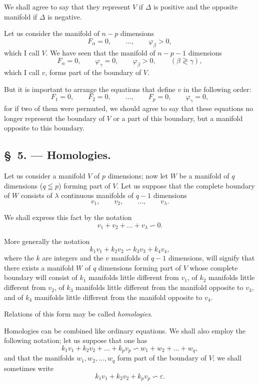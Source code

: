 \documentclass{article}
\begin{document}
We shall agree to say that they represent $V$ if $\Delta$ is positive and the opposite manifold if $\Delta$ is negative.

Let us consider the manifold of $n - p$ dimensions
\[
F_{\alpha} = 0, \qquad \ldots, \qquad \varphi_{\beta} > 0,
\]
which I call $V$. We have seen that the manifold of $n - p - 1$ dimensions
\[
F_{\alpha} = 0, \qquad \varphi_{\gamma} = 0, \qquad \varphi_{\beta} > 0, \qquad (\beta \gtrless \gamma),
\]
which I call $v$, forms part of the boundary of $V$.

But it is important to arrange the equations that define $v$ in the following order:
\[
F_{1} = 0, \qquad F_{2} = 0, \qquad \ldots, \qquad F_{p} = 0, \qquad \varphi_{\gamma} = 0,
\]
for if two of them were permuted, we should agree to say that these equations no longer represent the boundary of $V$ or a part of this boundary, but a manifold opposite to this boundary.

\subsection*{\S~5. --- Homologies.}

Let us consider a manifold $V$ of $p$ dimensions; now let $W$ be a manifold of $q$ dimensions ($q \leqq p$) forming part of $V$. Let us suppose that the complete boundary of $W$ consists of $\lambda$ continuous manifolds of $q - 1$ dimensions
\[
v_{1}, \qquad v_{2}, \qquad \ldots, \qquad v_{\lambda}.
\]

We shall express this fact by the notation
\[
v_{1} + v_{2} + \ldots + v_{\lambda} \backsim 0.
\]

More generally the notation
\[
k_{1}v_{1} + k_{2}v_{2} \backsim k_{3}v_{3} + k_{4}v_{4},
\]
where the $k$ are integers and the $v$ manifolds of $q - 1$ dimensions, will signify that there exists a manifold $W$ of $q$ dimensions forming part of $V$ whose complete boundary will consist of $k_{1}$ manifolds little different from $v_{1}$, of $k_{2}$ manifolds little different from $v_{2}$, of $k_{3}$ manifolds little different from the manifold
opposite to $v_{3}$, and of $k_{4}$ manifolds little different from the manifold opposite to $v_{4}$.

Relations of this form may be called \emph{homologies}.

Homologies can be combined like ordinary equations. We shall also employ the following notation; let us suppose that one has
\[
k_{1}v_{1} + k_{2}v_{2} + \ldots + k_{p}v_{p} \backsim w_{1} + w_{2} + \ldots + w_{q},
\]
and that the manifolds $w_{1}, w_{2}, \ldots, w_{q}$ form part of the boundary of $V$; we shall sometimes write
\[
k_{1}v_{1} + k_{2}v_{2} + k_{p}v_{p} \backsim \varepsilon.
\]
\end{document}
